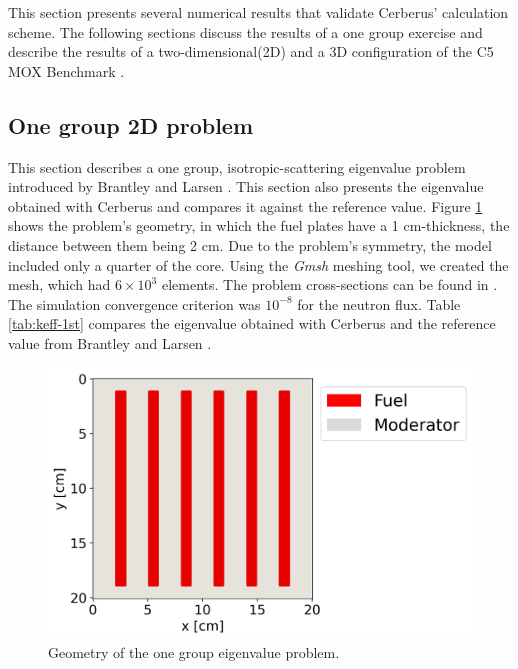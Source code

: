 \documentclass{anstrans}
\begin{document}
This section presents several numerical results that validate Cerberus' calculation scheme.
The following sections discuss the results of a one group exercise and describe the results of a two-dimensional(2D) and a 3D configuration of the C5 MOX Benchmark \cite{cavarec_benchmark_1994}.

\subsection{One group 2D problem}

This section describes a one group, isotropic-scattering eigenvalue problem introduced by Brantley and Larsen \cite{brantley_simplifiedP3_2000}.
This section also presents the eigenvalue obtained with Cerberus and compares it against the reference value.
Figure \ref{fig:2D} shows the problem's geometry, in which the fuel plates have a 1 cm-thickness, the distance between them being 2 cm.
Due to the problem's symmetry, the model included only a quarter of the core.
Using the \textit{Gmsh} \cite{geuzaine_gmsh_2009} meshing tool, we created the mesh, which had $6 \times 10^{3}$ elements.
The problem cross-sections can be found in \cite{brantley_simplifiedP3_2000}.
The simulation convergence criterion was $10^{-8}$ for the neutron flux.
Table \ref{tab:keff-1st} compares the eigenvalue obtained with Cerberus and the reference value from Brantley and Larsen \cite{brantley_simplifiedP3_2000}.

\begin{figure}[htbp!] %
    \centering
    \includegraphics[width=0.85\linewidth]{figures/mesh2.png}
    \hfill
    \caption{Geometry of the one group eigenvalue problem.}
    \label{fig:2D}
\end{figure}
\end{document}
